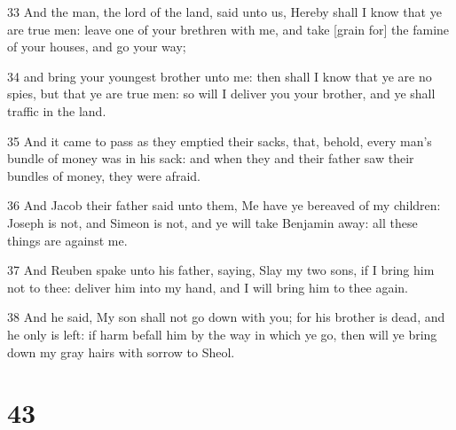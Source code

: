 \par 33 And the man, the lord of the land, said unto us, Hereby shall I know that ye are true men: leave one of your brethren with me, and take [grain for] the famine of your houses, and go your way;
\par 34 and bring your youngest brother unto me: then shall I know that ye are no spies, but that ye are true men: so will I deliver you your brother, and ye shall traffic in the land.
\par 35 And it came to pass as they emptied their sacks, that, behold, every man's bundle of money was in his sack: and when they and their father saw their bundles of money, they were afraid.
\par 36 And Jacob their father said unto them, Me have ye bereaved of my children: Joseph is not, and Simeon is not, and ye will take Benjamin away: all these things are against me.
\par 37 And Reuben spake unto his father, saying, Slay my two sons, if I bring him not to thee: deliver him into my hand, and I will bring him to thee again.
\par 38 And he said, My son shall not go down with you; for his brother is dead, and he only is left: if harm befall him by the way in which ye go, then will ye bring down my gray hairs with sorrow to Sheol.

\chapter{43}

